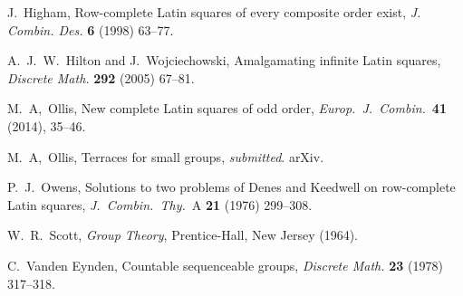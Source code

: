 \documentclass[12pt,a4paper]{article}
\newcommand{\Z}{\mathbb{Z}}
\begin{document}
\begin{thebibliography}{99}
J.~Higham, Row-complete Latin squares of every composite order exist, {\em J. Combin. Des.} {\bf 6} (1998) 63--77. 

A.~J.~W.~Hilton and J.~Wojciechowski, Amalgamating infinite Latin squares, {\em Discrete Math.} {\bf 292} (2005) 67--81.







M.~A,~Ollis, New complete Latin squares of odd order, {\em Europ.~J.~Combin.}~{\bf 41} (2014), 35--46.

M.~A,~Ollis, Terraces for small groups, {\em submitted}. arXiv.

P.~J.~Owens,  Solutions to two problems of Denes and Keedwell on row-complete
Latin squares, {\em J.~Combin.~Thy.}~A {\bf 21} (1976) 299--308.


W.~R.~Scott, {\em Group Theory}, Prentice-Hall, New Jersey (1964).


C.~Vanden Eynden, Countable sequenceable groups, {\em Discrete Math.} {\bf 23} (1978) 317--318.








\end{thebibliography}
\end{document}
